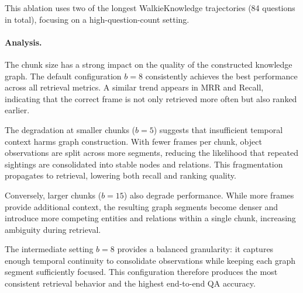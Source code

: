 This ablation uses two of the longest WalkieKnowledge trajectories (84 questions in total), focusing on a high-question-count setting.

\paragraph{Analysis.}

The chunk size has a strong impact on the quality of the constructed knowledge graph.
The default configuration $b{=}8$ consistently achieves the best performance across all retrieval metrics.
A similar trend appears in MRR and Recall, indicating that the correct frame is not only retrieved more often but also ranked earlier.

The degradation at smaller chunks ($b{=}5$) suggests that insufficient temporal context harms graph construction.
With fewer frames per chunk, object observations are split across more segments, reducing the likelihood that repeated sightings are consolidated into stable nodes and relations.
This fragmentation propagates to retrieval, lowering both recall and ranking quality.

Conversely, larger chunks ($b{=}15$) also degrade performance.
While more frames provide additional context, the resulting graph segments become denser and introduce more competing entities and relations within a single chunk, increasing ambiguity during retrieval.

The intermediate setting $b{=}8$ provides a balanced granularity: it captures enough temporal continuity to consolidate observations while keeping each graph segment sufficiently focused.
This configuration therefore produces the most consistent retrieval behavior and the highest end-to-end QA accuracy.




